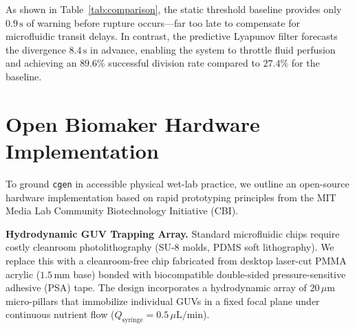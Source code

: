 \documentclass[letterpaper]{article}
\begin{document}
\begin{table}[h]
\centering
\caption{\textbf{Comparative Control Performance under 500 Stochastic Flow Perturbation Trials.}}
\label{tab:comparison}
\vspace{1mm}
\end{table}

As shown in Table~\ref{tab:comparison}, the static threshold baseline provides only $0.9\,\text{s}$ of warning before rupture occurs—far too late to compensate for microfluidic transit delays. In contrast, the predictive Lyapunov filter forecasts the divergence $8.4\,\text{s}$ in advance, enabling the system to throttle fluid perfusion and achieving an $89.6\%$ successful division rate compared to $27.4\%$ for the baseline.

\section{Open Biomaker Hardware Implementation}

To ground \texttt{cgen} in accessible physical wet-lab practice, we outline an open-source hardware implementation based on rapid prototyping principles from the MIT Media Lab Community Biotechnology Initiative (CBI).

\textbf{Hydrodynamic GUV Trapping Array.} Standard microfluidic chips require costly cleanroom photolithography (SU-8 molds, PDMS soft lithography). We replace this with a cleanroom-free chip fabricated from desktop laser-cut PMMA acrylic ($1.5\,\text{mm}$ base) bonded with biocompatible double-sided pressure-sensitive adhesive (PSA) tape. The design incorporates a hydrodynamic array of $20\,\mu\text{m}$ micro-pillars that immobilize individual GUVs in a fixed focal plane under continuous nutrient flow ($Q_{\text{syringe}} = 0.5\,\mu\text{L/min}$).
\end{document}
